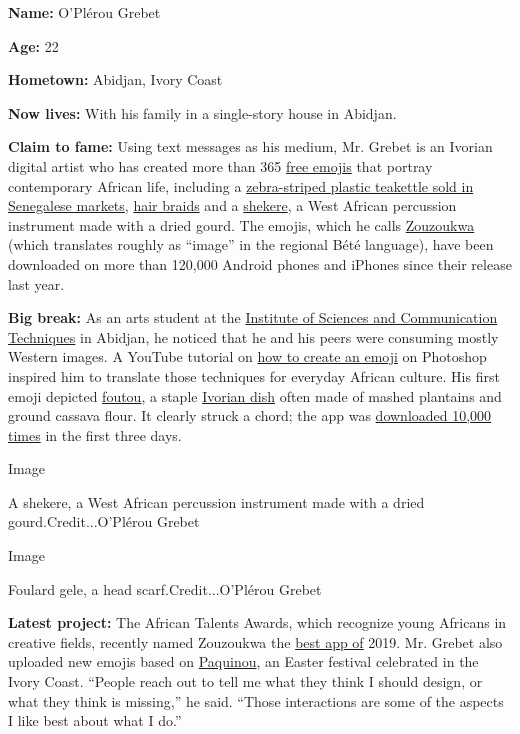 \textbf{Name:} O'Plérou Grebet

\textbf{Age:} 22

\textbf{Hometown:} Abidjan, Ivory Coast

\textbf{Now lives:} With his family in a single-story house in Abidjan.

\begin{quote}
\end{quote}

\textbf{Claim to fame:} Using text messages as his medium, Mr. Grebet is
an Ivorian digital artist who has created more than 365
\href{https://www.instagram.com/creativorian/}{free emojis} that portray
contemporary African life, including a
\href{https://www.instagram.com/p/BfbuSBlgqlO/}{zebra-striped plastic
teakettle sold in Senegalese markets},
\href{https://www.instagram.com/p/BgE6VRoBi9O/}{hair braids} and a
\href{https://www.pinterest.com/pin/425449496045347582/}{shekere}, a
West African percussion instrument made with a dried gourd. The emojis,
which he calls
\href{https://apps.apple.com/fr/app/zouzoukwa/id1453717366}{Zouzoukwa}
(which translates roughly as ``image'' in the regional Bété language),
have been downloaded on more than 120,000 Android phones and iPhones
since their release last year.

\textbf{Big break:} As an arts student at the
\href{http://istc-gouv-ci.net}{Institute of Sciences and Communication
Techniques} in Abidjan, he noticed that he and his peers were consuming
mostly Western images. A YouTube tutorial on
\href{https://www.youtube.com/watch?v=D5ovtITGrSw}{how to create an
emoji} on Photoshop inspired him to translate those techniques for
everyday African culture. His first emoji depicted
\href{https://www.instagram.com/creativorian/p/Bdaxpv7gc8M/}{foutou}, a
staple \href{https://www.youtube.com/watch?v=n-7U7ZK1h3M}{Ivorian dish}
often made of mashed plantains and ground cassava flour. It clearly
struck a chord; the app was
\href{https://www.instagram.com/p/BsMQhzmHjIu/?igshid=182u8hb857e9}{downloaded
10,000 times} in the first three days.

Image

A shekere, a West African percussion instrument made with a dried
gourd.Credit...O'Plérou Grebet

Image

Foulard gele, a head scarf.Credit...O'Plérou Grebet

\textbf{Latest project:} The African Talents Awards, which recognize
young Africans in creative fields, recently named Zouzoukwa the
\href{http://africantalentsawards.com/?page_id=2560}{best app of} 2019.
Mr. Grebet also uploaded new emojis based on
\href{https://www.instagram.com/p/BwgshCsHnjW/}{Paquinou}, an Easter
festival celebrated in the Ivory Coast. ``People reach out to tell me
what they think I should design, or what they think is missing,'' he
said. ``Those interactions are some of the aspects I like best about
what I do.''

